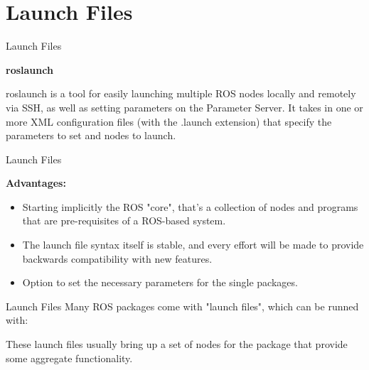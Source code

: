 \documentclass{beamer}
\begin{document}
\section{Launch Files}
\begin{frame}{Launch Files}
\begin{large}
	\textbf{roslaunch} \newline \newline
\end{large}
roslaunch is a tool for easily launching multiple ROS nodes locally and remotely via SSH, as well as setting parameters on the Parameter Server. \newline \newline
It takes in one or more XML configuration files (with the .launch extension) that specify the parameters to set and nodes to launch.
\end{frame}
\begin{frame}{Launch Files}
	\begin{large}
		\textbf{Advantages:} \newline
	\end{large}
\begin{itemize}
	\item Starting implicitly the ROS "core", that's a collection of nodes and programs that are pre-requisites of a ROS-based system.
	\newline
	\item The launch file syntax itself is stable, and every effort will be made to provide backwards compatibility with new features. 
	\newline
	\item Option to set the necessary parameters for the single packages. 
\end{itemize}
\end{frame}
\begin{frame}{Launch Files}
Many ROS packages come with "launch files", which can be runned with:



These launch files usually bring up a set of nodes for the package that provide some aggregate functionality. 
\end{frame}
\end{document}
